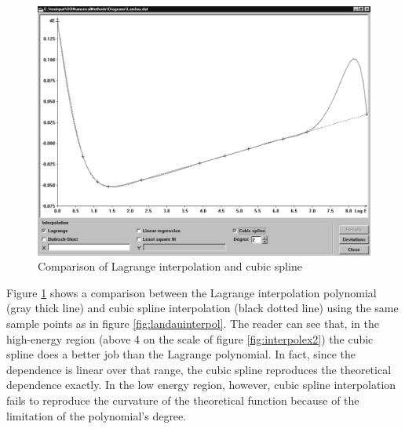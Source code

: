 \begin{figure}
\label{fig:interpolex3}
\centering\includegraphics[width=12cm]{Figures/LagrangeVsSpline}
\caption{Comparison of Lagrange interpolation and cubic spline}
\end{figure}
Figure \ref{fig:interpolex3} shows a comparison between the
Lagrange interpolation polynomial (gray thick line) and cubic
spline interpolation (black dotted line) using the same sample
points as in figure \ref{fig:landauinterpol}. The reader can see
that, in the high-energy region (above 4 on the scale of figure
\ref{fig:interpolex2}) the cubic spline does a better job than the
Lagrange polynomial. In fact, since the dependence is linear over
that range, the cubic spline reproduces the theoretical dependence
exactly. In the low energy region, however, cubic spline
interpolation fails to reproduce the curvature of the theoretical
function because of the limitation of the polynomial's degree.

